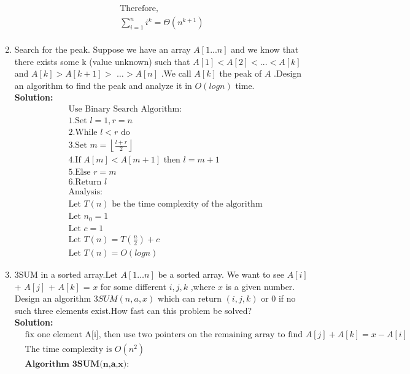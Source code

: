 \begin{enumerate}
\begin{align*}
        &\text{Therefore, }&\\
        &\sum_{i=1}^{n}i^k=\Theta(n^{k+1})&\\
    \end{align*}
    \item Search for the peak. Suppose we have an array $A[1...n]$ and we know that there exists some k (value unknown) such that $A[1]<A[2]<...<A[k]$ and $A[k]>A[k+1]>$ $\ldots>A[n]$ .We call $A[k]$ the peak of $A$ .Design an algorithm to find the peak and analyze it in $O(logn)$ time.
    \\\textbf{Solution:}
    \begin{align*}
        &\text{Use Binary Search Algorithm:}\\
        &\text{1.} \text{Set } l=1,r=n\\
        &\text{2.} \text{While } l<r \text{ do}\\
        &\text{3.} \text{Set } m=\left\lfloor\frac{l+r}{2}\right\rfloor\\
        &\text{4.} \text{If } A[m]<A[m+1] \text{ then } l=m+1\\
        &\text{5.} \text{Else } r=m\\
        &\text{6.} \text{Return } l\\
        &\text{Analysis:}\\
        &\text{Let } T(n) \text{ be the time complexity of the algorithm}\\
        &\text{Let } n_0=1\\
        &\text{Let } c=1\\
        &\text{Let } T(n)=T\left(\frac{n}{2}\right)+c\\
        &\text{Let } T(n)=O(logn)
    \end{align*}
    \item 3SUM in a sorted array.Let $A[1\ldots n]$ be a sorted array. We want to see $A[ i]$ + $A[ j]$ + $A[ k]$ = $x$ for some different $i,j,k$ ,where $x$ is a given number. Design an algorithm $3SUM(n,a,x)$ which can return $(i,j,k)$ or 0 if no such three elements exist.How fast can this problem be solved?
    \\\textbf{Solution:}
    \begin{align*}
        &\text{fix one element A[i], then use two pointers on the remaining array to find } A[j]+A[k]=x-A[i]\\
        &\text{The time complexity is }O(n^2)\\
        &\textbf{Algorithm 3SUM(n,a,x):}\\

\end{align*}
\end{enumerate}
